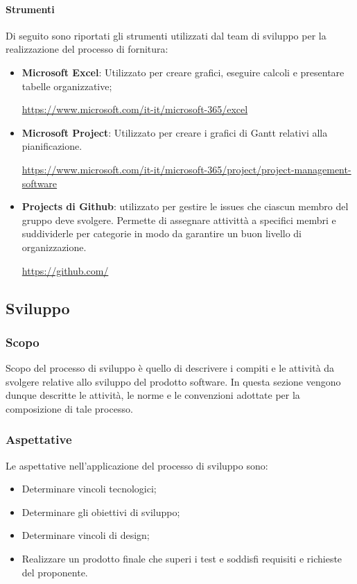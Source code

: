 \paragraph{Strumenti}\label{paragraph: strumenti_fornitura}
Di seguito sono riportati gli strumenti utilizzati dal team di sviluppo per la realizzazione del processo di fornitura:
\begin{itemize}
    \item \textbf{Microsoft Excel}: Utilizzato per creare grafici, eseguire calcoli e presentare tabelle organizzative;
          \begin{center}
              \url{https://www.microsoft.com/it-it/microsoft-365/excel}
          \end{center}
    \item \textbf{Microsoft Project}: Utilizzato per creare i grafici di Gantt\glo{} relativi alla pianificazione.
          \begin{center}
              \url{https://www.microsoft.com/it-it/microsoft-365/project/project-management-software}
          \end{center}
    \item \textbf{Projects di Github}: utilizzato per gestire le issues\glo{} che ciascun membro del gruppo deve svolgere.
          Permette di assegnare attivittà a specifici membri e suddividerle per categorie in modo da garantire un buon livello di organizzazione.
          \begin{center}
              \url{https://github.com/}
          \end{center}
\end{itemize}

\vspace{2cm}

\subsection{Sviluppo} \label{subsection:Sviluppo}
\subsubsection{Scopo} \label{subsubsection:Sviluppo_Scopo}
Scopo del processo di sviluppo è quello di descrivere i compiti e le attività da svolgere relative allo sviluppo del prodotto software.
In questa sezione vengono dunque descritte le attività, le norme e le convenzioni adottate per la composizione di tale processo.

\subsubsection{Aspettative} \label{subsubsection:Sviluppo_Aspettative}
Le aspettative nell'applicazione del processo di sviluppo sono:
\begin{itemize}
    \item Determinare vincoli tecnologici;
    \item Determinare gli obiettivi di sviluppo;
    \item Determinare vincoli di design;
    \item Realizzare un prodotto finale che superi i test e soddisfi requisiti e richieste del proponente.
\end{itemize}

